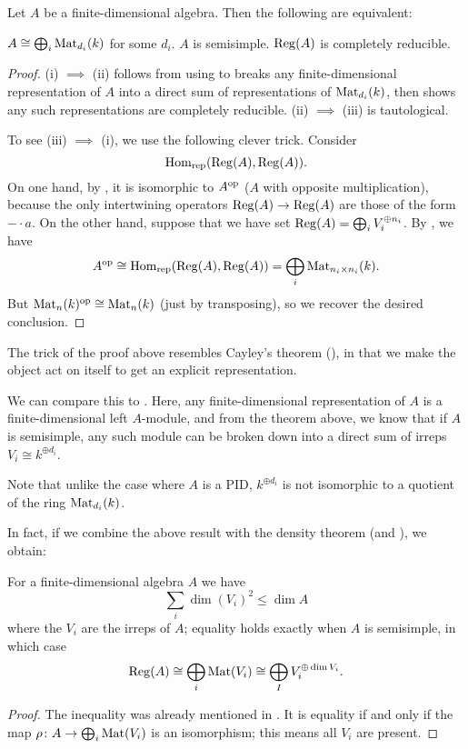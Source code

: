 \begin{theorem}
	Let $A$ be a finite-dimensional algebra.
	Then the following are equivalent:
	\begin{enumerate}[(i)]
		\ii $A \cong \bigoplus_i \mathrm{Mat}_{d_i}(k)$ for some $d_i$.
		\ii $A$ is semisimple.
		\ii $\operatorname{Reg}(A)$ is completely reducible.
	\end{enumerate}
\end{theorem}
\begin{proof}
	(i) $\implies$ (ii) follows from
	using  to breaks any finite-dimensional
	representation of $A$ into a direct sum of representations of
	$\mathrm{Mat}_{d_i}(k)$, then  shows any such representations are
	completely reducible.
	(ii) $\implies$ (iii) is tautological.

	To see (iii) $\implies$ (i), we use the following clever trick.
	Consider
	\[ \operatorname{Hom}_{\mathrm{rep}}(\operatorname{Reg}(A), \operatorname{Reg}(A)). \]
	On one hand, by ,
	it is isomorphic to $A^{\mathrm{op}}$ ($A$ with opposite multiplication),
	because the only intertwining operators $\operatorname{Reg}(A) \to \operatorname{Reg}(A)$
	are those of the form $- \cdot a$.
	On the other hand, suppose that we have set
	$ \operatorname{Reg}(A) = \bigoplus_i V_i^{\oplus n_i} $.
	By , we have
	\[ A^{\mathrm{op}} \cong \operatorname{Hom}_{\mathrm{rep}}(\operatorname{Reg}(A), \operatorname{Reg}(A))
		= \bigoplus_i \mathrm{Mat}_{n_i \times n_i}(k). \]
	But $\mathrm{Mat}_n(k)^{\mathrm{op}} \cong \mathrm{Mat}_n(k)$ (just by transposing),
	so we recover the desired conclusion.
\end{proof}

\begin{remark}
	The trick of the proof above resembles
	Cayley's theorem (), in that we make the object
	act on itself to get an explicit representation.
\end{remark}

\begin{remark}
	We can compare this to .
	Here, any finite-dimensional representation of $A$ is a
	finite-dimensional left $A$-module, and from the theorem above,
	we know that if $A$ is semisimple, any such module
	can be broken down into a direct sum of irreps $V_i \cong k^{\oplus d_i}$.

	Note that unlike the case where $A$ is a PID,
	$k^{\oplus d_i}$ is not isomorphic to a quotient of the ring $\mathrm{Mat}_{d_i}(k)$.
\end{remark}

In fact, if we combine the above result with
the density theorem (and ), we obtain:
\begin{theorem}
	For a finite-dimensional algebra $A$ we have
	\[ \sum_{i} \dim(V_i)^2 \le \dim A \]
	where the $V_i$ are the irreps of $A$;
	equality holds exactly when $A$ is semisimple,
	in which case
	\[ \operatorname{Reg}(A) \cong \bigoplus_i \mathrm{Mat}(V_i)
		\cong \bigoplus_I V_i^{\oplus \dim V_i}. \]
\end{theorem}
\begin{proof}
	The inequality was already mentioned in .
	It is equality if and only if the map $\rho \colon A \to \bigoplus_i \mathrm{Mat}(V_i)$
	is an isomorphism; this means all $V_i$ are present.
\end{proof}

